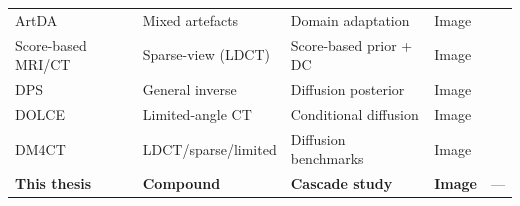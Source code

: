 \begin{table}[!htb]
\begin{tabular}{@{}l l l l c@{}}
        ArtDA         & Mixed artefacts      & Domain adaptation      & Image            & \cite{Liang2025}      \\
        Score-based MRI/CT & Sparse-view (LDCT) & Score-based prior + DC & Image            & \cite{Song2022}       \\
        DPS           & General inverse      & Diffusion posterior    & Image            & \cite{Chung2023}      \\
        DOLCE         & Limited-angle CT     & Conditional diffusion  & Image            & \cite{Liu2023DOLCE}   \\
        DM4CT         & LDCT/sparse/limited  & Diffusion benchmarks   & Image            & \cite{DM4CT2025}      \\
        \midrule
        \textbf{This thesis} & \textbf{Compound} & \textbf{Cascade study} & \textbf{Image} & ---             \\
        \bottomrule
    \end{tabular}
\end{table}
